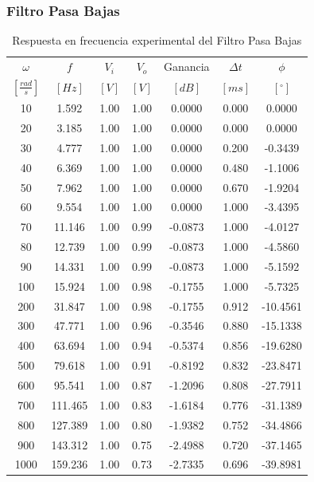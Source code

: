 \documentclass{article}
\begin{document}
\subsubsection{Filtro Pasa Bajas}
\begin{table}[H]
\centering
\caption{Respuesta en frecuencia experimental del Filtro Pasa Bajas}
\label{tab:filtro_pasabajas}
\begin{tabular}{ccccccc}
	\toprule
	
$\omega$ & $f$ & $V_{i}$ & $V_{o}$ & Ganancia & $\Delta t$ & $\phi$ \\
$[\frac{{rad}}{{s}}]$ & {$[Hz]$} & $[V]$ & $[V]$ & $[dB]$ & $[ms]$ & $[^\circ]$ \\
\midrule
10    & 1.592    & 1.00 & 1.00 &   0.0000 & 0.000 &   0.0000 \\
20    & 3.185    & 1.00 & 1.00 &   0.0000 & 0.000 &   0.0000 \\
30    & 4.777    & 1.00 & 1.00 &   0.0000 & 0.200 &  -0.3439 \\
40    & 6.369    & 1.00 & 1.00 &   0.0000 & 0.480 &  -1.1006 \\
50    & 7.962    & 1.00 & 1.00 &   0.0000 & 0.670 &  -1.9204 \\
60    & 9.554    & 1.00 & 1.00 &   0.0000 & 1.000 &  -3.4395 \\
70    & 11.146   & 1.00 & 0.99 &  -0.0873 & 1.000 &  -4.0127 \\
80    & 12.739   & 1.00 & 0.99 &  -0.0873 & 1.000 &  -4.5860 \\
90    & 14.331   & 1.00 & 0.99 &  -0.0873 & 1.000 &  -5.1592 \\
100   & 15.924   & 1.00 & 0.98 &  -0.1755 & 1.000 &  -5.7325 \\
200   & 31.847   & 1.00 & 0.98 &  -0.1755 & 0.912 & -10.4561 \\
300   & 47.771   & 1.00 & 0.96 &  -0.3546 & 0.880 & -15.1338 \\
400   & 63.694   & 1.00 & 0.94 &  -0.5374 & 0.856 & -19.6280 \\
500   & 79.618   & 1.00 & 0.91 &  -0.8192 & 0.832 & -23.8471 \\
600   & 95.541   & 1.00 & 0.87 &  -1.2096 & 0.808 & -27.7911 \\
700   & 111.465  & 1.00 & 0.83 &  -1.6184 & 0.776 & -31.1389 \\
800   & 127.389  & 1.00 & 0.80 &  -1.9382 & 0.752 & -34.4866 \\
900   & 143.312  & 1.00 & 0.75 &  -2.4988 & 0.720 & -37.1465 \\
1000  & 159.236  & 1.00 & 0.73 &  -2.7335 & 0.696 & -39.8981 \\

\end{tabular}
\end{table}
\end{document}
